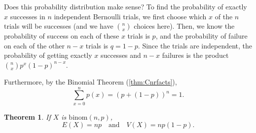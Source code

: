 \documentclass[
]{book}
\newtheorem{theorem}{Theorem}[chapter]
\theoremstyle{definition}
\theoremstyle{definition}
\theoremstyle{definition}
\theoremstyle{definition}
\theoremstyle{remark}
\begin{document}
Does this probability distribution make sense? To find the probability of exactly \(x\) successes in \(n\) independent Bernoulli trials, we first choose which \(x\) of the \(n\) trials will be successes (and we have \(\binom{n}{x}\) choices here). Then, we know the probability of success on each of these \(x\) trials is \(p\), and the probability of failure on each of the other \(n-x\) trials is \(q = 1-p\). Since the trials are independent, the probability of getting exactly \(x\) successes and \(n-x\) failures is the product \(\binom{n}{x}p^x(1-p)^{n-x}.\)

Furthermore, by the Binomial Theorem (\ref{thm:Cnrfacts}), \[\sum_{x = 0}^n p(x) = (p+(1-p))^n = 1.\]

\begin{theorem}
\protect\hypertarget{thm:binomial-distribution-EandV}{}\label{thm:binomial-distribution-EandV}If \(X\) is \(\text{binom}(n,p)\), \[E(X) = np~~~\text{ and }~~~ V(X) = np(1-p).\]
\end{theorem}
\end{document}
